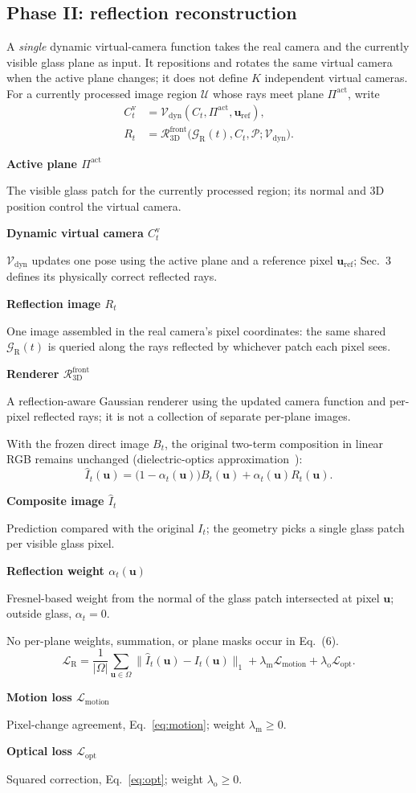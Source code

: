 \documentclass[10pt,a4paper]{article}
\newcommand{\notation}[2]{\noindent\textbf{#1}\par\nopagebreak #2\par}
\newcommand{\GR}{\mathcal G_{\mathrm R}}
\newcommand{\RRf}{\mathcal R_{\mathrm{3D}}^{\mathrm{front}}}
\newcommand{\Vf}{\mathcal V_{\mathrm{dyn}}}
\newcommand{\uu}{\mathbf u}
\newcommand{\Om}{\Omega}
\newcommand{\notepair}[4]{\par\noindent
\begin{minipage}[t]{0.485\textwidth}\small\notation{#1}{#2}\end{minipage}\hfill
\begin{minipage}[t]{0.485\textwidth}\small\notation{#3}{#4}\end{minipage}\par\vspace{1pt}}
\begin{document}
\subsection*{Phase II: reflection reconstruction}
A \emph{single} dynamic virtual-camera function takes the real camera and the
currently visible glass plane as input. It repositions and rotates the same
virtual camera when the active plane changes; it does not define $K$
independent virtual cameras. For a currently processed image region $\mathcal U$
whose rays meet plane $\Pi^{\mathrm{act}}$, write
\begin{equation}
\boxed{\begin{aligned}
C_t^{\mathrm v}
&=\Vf(C_t,\Pi^{\mathrm{act}},\uu_{\mathrm{ref}}),\\[-1pt]
R_t
&=\RRf\bigl(\GR(t),C_t,\mathcal P;\Vf\bigr).
\end{aligned}} \tag{5}
\end{equation}
\notepair{Active plane $\Pi^{\mathrm{act}}$}{The visible glass patch for the currently processed region; its normal and 3D position control the virtual camera.}
{Dynamic virtual camera $C_t^{\mathrm v}$}{$\Vf$ updates one pose using the active plane and a reference pixel $\uu_{\mathrm{ref}}$; Sec.~3 defines its physically correct reflected rays.}
\notepair{Reflection image $R_t$}{One image assembled in the real camera's pixel coordinates: the same shared $\GR(t)$ is queried along the rays reflected by whichever patch each pixel sees.}
{Renderer $\RRf$}{A reflection-aware Gaussian renderer using the updated camera function and per-pixel reflected rays; it is not a collection of separate per-plane images.}
With the frozen direct image $B_t$, the original two-term composition in
linear RGB remains unchanged (dielectric-optics approximation~\cite{pbrt}):
\begin{equation}
\boxed{\hat I_t(\uu)=
\bigl(1-\alpha_t(\uu)\bigr)B_t(\uu)
+\alpha_t(\uu)R_t(\uu).} \tag{6}
\end{equation}
\notepair{Composite image $\hat I_t$}{Prediction compared with the original $I_t$; the geometry picks a single glass patch per visible glass pixel.}
{Reflection weight $\alpha_t(\uu)$}{Fresnel-based weight from the normal of the glass patch intersected at pixel $\uu$; outside glass, $\alpha_t=0$.}
No per-plane weights, summation, or plane masks occur in Eq.~(6).
\begin{equation}
\mathcal L_{\mathrm R}=\frac{1}{|\Om|}\sum_{\uu\in\Om}
\bigl\|\hat I_t(\uu)-I_t(\uu)\bigr\|_1
+\lambda_{\mathrm m}\mathcal L_{\mathrm{motion}}
+\lambda_{\mathrm o}\mathcal L_{\mathrm{opt}}. \tag{7}
\end{equation}
\notepair{Motion loss $\mathcal L_{\mathrm{motion}}$}{Pixel-change agreement, Eq.~\eqref{eq:motion}; weight $\lambda_{\mathrm m}\geq0$.}
{Optical loss $\mathcal L_{\mathrm{opt}}$}{Squared correction, Eq.~\eqref{eq:opt}; weight $\lambda_{\mathrm o}\geq0$.}
\end{document}
